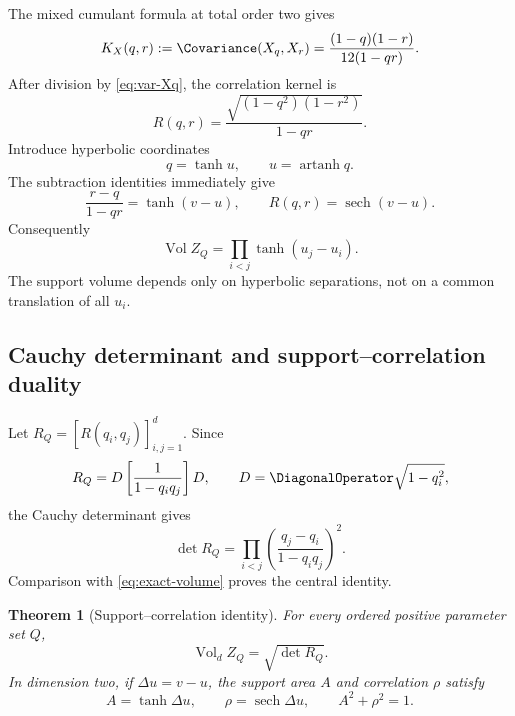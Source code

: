 \documentclass[11pt,a4paper]{article}
\newtheorem{theorem}{Theorem}[section]
\theoremstyle{definition}
\theoremstyle{remark}
\newcommand{\Vol}{\operatorname{Vol}}
\newcommand{\sech}{\operatorname{sech}}
\newcommand{\atanh}{\operatorname{artanh}}
\begin{document}
The mixed cumulant formula at total order two gives
\begin{equation}
  K_X(q,r):=\Covariance(X_q,X_r)
   =\frac{(1-q)(1-r)}{12(1-qr)}.
  \label{eq:cov-X}
\end{equation}
After division by \eqref{eq:var-Xq}, the correlation kernel is
\begin{equation}
  R(q,r)
   =\frac{\sqrt{(1-q^2)(1-r^2)}}{1-qr}.
  \label{eq:corr-q}
\end{equation}
Introduce hyperbolic coordinates
\begin{equation}
  q=\tanh u,\qquad u=\atanh q.
  \label{eq:hyperbolic-coordinate}
\end{equation}
The subtraction identities immediately give
\begin{equation}
  \frac{r-q}{1-qr}=\tanh(v-u),
  \qquad
  R(q,r)=\sech(v-u).
  \label{eq:tanh-sech-pair}
\end{equation}
Consequently
\begin{equation}
  \Vol Z_Q=\prod_{i<j}\tanh(u_j-u_i).
  \label{eq:hyperbolic-volume}
\end{equation}
The support volume depends only on hyperbolic separations, not on a common translation of all $u_i$.

\subsection{Cauchy determinant and support--correlation duality}

Let $R_Q=[R(q_i,q_j)]_{i,j=1}^d$.  Since
\[
 R_Q=D\left[\frac1{1-q_iq_j}\right]D,
 \qquad D=\DiagonalOperator\sqrt{1-q_i^2},
\]
the Cauchy determinant gives
\begin{equation}
  \det R_Q
   =\prod_{i<j}
      \left(\frac{q_j-q_i}{1-q_iq_j}\right)^2.
  \label{eq:corr-det}
\end{equation}
Comparison with \eqref{eq:exact-volume} proves the central identity.

\begin{theorem}[Support--correlation identity]
\label{thm:support-correlation}
For every ordered positive parameter set $Q$,
\begin{equation}
 \boxed{\Vol_d Z_Q=\sqrt{\det R_Q}.}
 \label{eq:support-correlation}
\end{equation}
In dimension two, if $\Delta u=v-u$, the support area $A$ and correlation $\rho$ satisfy
\begin{equation}
 A=\tanh\Delta u,\qquad \rho=\sech\Delta u,
 \qquad A^2+\rho^2=1.
 \label{eq:area-correlation-circle}
\end{equation}
\end{theorem}
\end{document}
